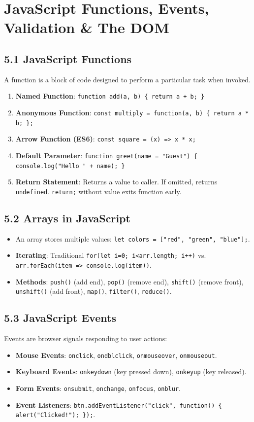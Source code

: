 \chapter{JavaScript Functions, Events, Validation \& The DOM}

\section{5.1 JavaScript Functions}
A function is a block of code designed to perform a particular task when invoked.
\begin{enumerate}[leftmargin=*]
    \item \textbf{Named Function}: \texttt{function add(a, b) \{ return a + b; \}}
    \item \textbf{Anonymous Function}: \texttt{const multiply = function(a, b) \{ return a * b; \};}
    \item \textbf{Arrow Function (ES6)}: \texttt{const square = (x) => x * x;}
    \item \textbf{Default Parameter}: \texttt{function greet(name = "Guest") \{ console.log("Hello " + name); \}}
    \item \textbf{Return Statement}: Returns a value to caller. If omitted, returns \texttt{undefined}. \texttt{return;} without value exits function early.
\end{enumerate}

\section{5.2 Arrays in JavaScript}
\begin{itemize}[leftmargin=*]
    \item An array stores multiple values: \texttt{let colors = ["red", "green", "blue"];}.
    \item \textbf{Iterating}: Traditional \texttt{for(let i=0; i<arr.length; i++)} vs. \texttt{arr.forEach(item => console.log(item))}.
    \item \textbf{Methods}: \texttt{push()} (add end), \texttt{pop()} (remove end), \texttt{shift()} (remove front), \texttt{unshift()} (add front), \texttt{map()}, \texttt{filter()}, \texttt{reduce()}.
\end{itemize}

\section{5.3 JavaScript Events}
Events are browser signals responding to user actions:
\begin{itemize}[leftmargin=*]
    \item \textbf{Mouse Events}: \texttt{onclick}, \texttt{ondblclick}, \texttt{onmouseover}, \texttt{onmouseout}.
    \item \textbf{Keyboard Events}: \texttt{onkeydown} (key pressed down), \texttt{onkeyup} (key released).
    \item \textbf{Form Events}: \texttt{onsubmit}, \texttt{onchange}, \texttt{onfocus}, \texttt{onblur}.
    \item \textbf{Event Listeners}: \texttt{btn.addEventListener("click", function() \{ alert("Clicked!"); \});}.
\end{itemize}

